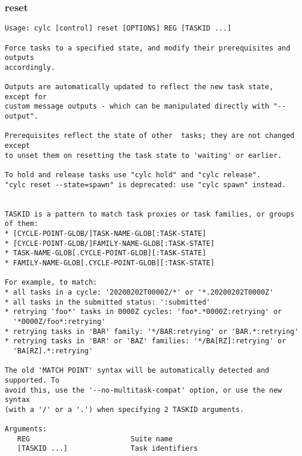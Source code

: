 \subsubsection{reset}
\label{reset}
\begin{lstlisting}
Usage: cylc [control] reset [OPTIONS] REG [TASKID ...] 

Force tasks to a specified state, and modify their prerequisites and outputs
accordingly.

Outputs are automatically updated to reflect the new task state, except for
custom message outputs - which can be manipulated directly with "--output".

Prerequisites reflect the state of other  tasks; they are not changed except
to unset them on resetting the task state to 'waiting' or earlier.

To hold and release tasks use "cylc hold" and "cylc release".
"cylc reset --state=spawn" is deprecated: use "cylc spawn" instead.


TASKID is a pattern to match task proxies or task families, or groups of them:
* [CYCLE-POINT-GLOB/]TASK-NAME-GLOB[:TASK-STATE]
* [CYCLE-POINT-GLOB/]FAMILY-NAME-GLOB[:TASK-STATE]
* TASK-NAME-GLOB[.CYCLE-POINT-GLOB][:TASK-STATE]
* FAMILY-NAME-GLOB[.CYCLE-POINT-GLOB][:TASK-STATE]

For example, to match:
* all tasks in a cycle: '20200202T0000Z/*' or '*.20200202T0000Z'
* all tasks in the submitted status: ':submitted'
* retrying 'foo*' tasks in 0000Z cycles: 'foo*.*0000Z:retrying' or
  '*0000Z/foo*:retrying'
* retrying tasks in 'BAR' family: '*/BAR:retrying' or 'BAR.*:retrying'
* retrying tasks in 'BAR' or 'BAZ' families: '*/BA[RZ]:retrying' or
  'BA[RZ].*:retrying'

The old 'MATCH POINT' syntax will be automatically detected and supported. To
avoid this, use the '--no-multitask-compat' option, or use the new syntax
(with a '/' or a '.') when specifying 2 TASKID arguments.

Arguments:
   REG                        Suite name
   [TASKID ...]               Task identifiers


\end{lstlisting}
